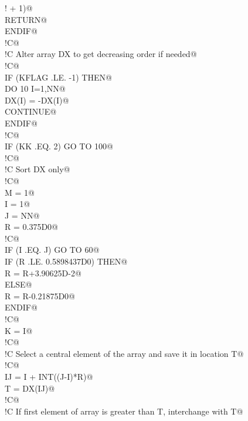 \documentclass[10pt,a4paper,notitlepage]{article}
\begin{document}
\begin{flushleft}
\begin{list}{}{}
\mbox{}\verb@!     +      1)@\\
\mbox{}\verb@         RETURN@\\
\mbox{}\verb@      ENDIF@\\
\mbox{}\verb@!C@\\
\mbox{}\verb@!C     Alter array DX to get decreasing order if needed@\\
\mbox{}\verb@!C@\\
\mbox{}\verb@      IF (KFLAG .LE. -1) THEN@\\
\mbox{}\verb@         DO 10 I=1,NN@\\
\mbox{}\verb@            DX(I) = -DX(I)@\\
\mbox{}    CONTINUE@\\
\mbox{}\verb@      ENDIF@\\
\mbox{}\verb@!C@\\
\mbox{}\verb@      IF (KK .EQ. 2) GO TO 100@\\
\mbox{}\verb@!C@\\
\mbox{}\verb@!C     Sort DX only@\\
\mbox{}\verb@!C@\\
\mbox{}\verb@      M = 1@\\
\mbox{}\verb@      I = 1@\\
\mbox{}\verb@      J = NN@\\
\mbox{}\verb@      R = 0.375D0@\\
\mbox{}\verb@!C@\\
\mbox{} IF (I .EQ. J) GO TO 60@\\
\mbox{}\verb@      IF (R .LE. 0.5898437D0) THEN@\\
\mbox{}\verb@         R = R+3.90625D-2@\\
\mbox{}\verb@      ELSE@\\
\mbox{}\verb@         R = R-0.21875D0@\\
\mbox{}\verb@      ENDIF@\\
\mbox{}\verb@!C@\\
\mbox{} K = I@\\
\mbox{}\verb@!C@\\
\mbox{}\verb@!C     Select a central element of the array and save it in location T@\\
\mbox{}\verb@!C@\\
\mbox{}\verb@      IJ = I + INT((J-I)*R)@\\
\mbox{}\verb@      T = DX(IJ)@\\
\mbox{}\verb@!C@\\
\mbox{}\verb@!C     If first element of array is greater than T, interchange with T@\\

\end{list}
\end{flushleft}
\end{document}
